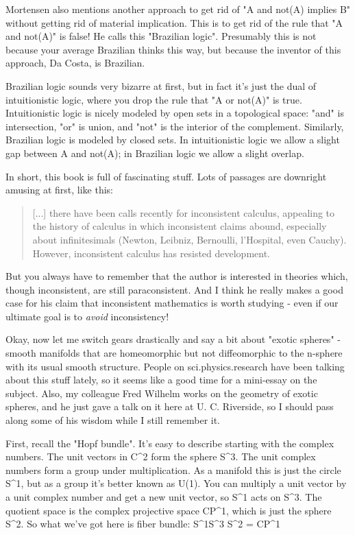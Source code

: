 Mortensen also mentions another approach to get rid of "A and
not(A) implies B" without getting rid of material implication.
This is to get rid of the rule that "A and not(A)" is false!
He calls this "Brazilian logic".  Presumably this is not
because your average Brazilian thinks this way, but because the inventor
of this approach, Da Costa, is Brazilian.

Brazilian logic sounds very bizarre at first, but in fact it's just the
dual of intuitionistic logic, where you drop the rule that "A or
not(A)" is true.  Intuitionistic logic is nicely modeled by open
sets in a topological space: "and" is intersection,
"or" is union, and "not" is the interior of the
complement.  Similarly, Brazilian logic is modeled by closed sets.  In
intuitionistic logic we allow a slight gap between A and not(A); in
Brazilian logic we allow a slight overlap.

In short, this book is full of fascinating stuff.  Lots of passages are
downright amusing at first, like this: 

\begin{quote}
     [...] there have been calls recently for inconsistent calculus,
     appealing to the history of calculus in which inconsistent claims
     abound, especially about infinitesimals (Newton, Leibniz,
     Bernoulli, l'Hospital, even Cauchy).  However, inconsistent
     calculus has resisted development.

\end{quote}
    
But you always have to remember that the author is interested in
theories which, though inconsistent, are still paraconsistent.  And I
think he really makes a good case for his claim that inconsistent
mathematics is worth studying - even if our ultimate goal is to \emph{avoid}
inconsistency! 

Okay, now let me switch gears drastically and say a bit about "exotic
spheres" - smooth manifolds that are homeomorphic but not diffeomorphic
to the n-sphere with its usual smooth structure.  People on
sci.physics.research have been talking about this stuff lately, so it
seems like a good time for a mini-essay on the subject.  Also, my
colleague Fred Wilhelm works on the geometry of exotic spheres, and he
just gave a talk on it here at U. C. Riverside, so I should pass along
some of his wisdom while I still remember it.  

First, recall the "Hopf bundle".  It's easy to describe
starting with the complex numbers.  The unit vectors in C^2 form the
sphere S^{3}.  The unit complex numbers form a group under multiplication.
As a manifold this is just the circle S^{1}, but as a group it's better
known as U(1).  You can multiply a unit vector by a unit complex number
and get a new unit vector, so S^{1} acts on S^{3}.  The quotient space is
the complex projective space CP^{1}, 
which is just the sphere S^{2}.  So
what we've got here is fiber bundle:
S^{1}\to  S^{3} \to  S^{2} = CP^{1}

